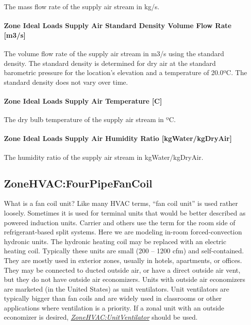 The mass flow rate of the supply air stream in kg/s.

\paragraph{Zone Ideal Loads Supply Air Standard Density Volume Flow Rate {[}m3/s{]}}\label{zone-ideal-loads-supply-air-standard-density-volume-flow-rate-m3s}

The volume flow rate of the supply air stream in m3/s using the standard density. The standard density is determined for dry air at the standard barometric pressure for the location's elevation and a temperature of 20.0ºC. The standard density does not vary over time.

\paragraph{Zone Ideal Loads Supply Air Temperature {[}C{]}}\label{zone-ideal-loads-supply-air-temperature-c}

The dry bulb temperature of the supply air stream in ºC.


\paragraph{Zone Ideal Loads Supply Air Humidity Ratio {[}kgWater/kgDryAir{]}}\label{zone-ideal-loads-supply-air-humidity-ratio-kgWaterkgDryAir}

The humidity ratio of the supply air stream in kgWater/kgDryAir.


\subsection{ZoneHVAC:FourPipeFanCoil}\label{zonehvacfourpipefancoil}

What is a fan coil unit? Like many HVAC terms, ``fan coil unit'' is used rather loosely. Sometimes it is used for terminal units that would be better described as powered induction units. Carrier and others use the term for the room side of refrigerant-based split systems. Here we are modeling in-room forced-convection hydronic units. The hydronic heating coil may be replaced with an electric heating coil. Typically these units are small (200 -- 1200 cfm) and self-contained. They are mostly used in exterior zones, usually in hotels, apartments, or offices. They may be connected to ducted outside air, or have a direct outside air vent, but they do not have outside air economizers. Units with outside air economizers are marketed (in the United States) as unit ventilators. Unit ventilators are typically bigger than fan coils and are widely used in classrooms or other applications where ventilation is a priority. If a zonal unit with an outside economizer is desired, \emph{\hyperref[zonehvacunitventilator]{ZoneHVAC:UnitVentilator}} should be used.

